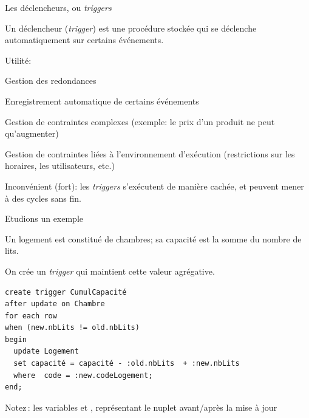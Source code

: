 
\begin{frame}[fragile]{Les déclencheurs, ou  \textit{triggers}}

Un \alert{déclencheur}  (\textit{trigger}) est  une procédure stockée qui se déclenche
 automatiquement sur certains événements.
 
 \vfill
 Utilité: 
\begin{redbullet}
 \item Gestion des redondances
   \item Enregistrement automatique de certains événements
  \item Gestion de contraintes complexes  (exemple: le prix d’un produit ne peut qu’augmenter)
   \item Gestion de contraintes liées à l’environnement d’exécution (restrictions sur les horaires, les utilisateurs, etc.)
\end{redbullet}
 
\vfill
\begin{blocgauche}
\alert{Inconvénient (fort)}: les \textit{triggers} s'exécutent de manière cachée, et peuvent mener
à des cycles sans fin.
\end{blocgauche}
\end{frame}

\begin{frame}[fragile]{Etudions un exemple}

Un logement est constitué de chambres; sa
capacité est la somme du nombre de lits.

\vfill

On crée un \textit{trigger} qui maintient cette valeur agrégative.
 
\begin{small}
\begin{verbatim}
create trigger CumulCapacité
after update on Chambre
for each row
when (new.nbLits != old.nbLits)
begin
  update Logement 
  set capacité = capacité - :old.nbLits  + :new.nbLits   
  where  code = :new.codeLogement;
end;
\end{verbatim}
\end{small}

\vfill

\begin{blocgauche}
\alert{Notez}\,: les variables  et , représentant le nuplet
avant/après la mise à jour
\end{blocgauche}

\end{frame}



